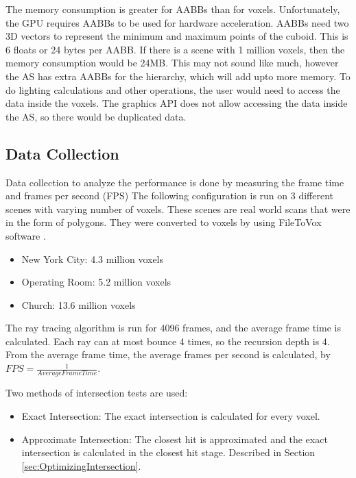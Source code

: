 \documentclass[12pt]{article}
\begin{document}
The memory consumption is greater for AABBs than for voxels.
Unfortunately, the GPU requires AABBs to be used for hardware acceleration.
AABBs need two 3D vectors to represent the minimum and maximum points of the cuboid.
This is 6 floats or 24 bytes per AABB.
If there is a scene with 1 million voxels, then the memory consumption would be 24MB.
This may not sound like much, however the AS has extra AABBs for the hierarchy, which will add upto more memory.
To do lighting calculations and other operations, the user would need to access the data inside the voxels.
The graphics API does not allow accessing the data inside the AS, so there would be duplicated data.

\subsection{Data Collection}
Data collection to analyze the performance is done by measuring the frame time and frames per second (FPS)
The following configuration is run on 3 different scenes with varying number of voxels.
These scenes are real world scans that were in the form of polygons.
They were converted to voxels by using FileToVox software \parencite{Github:FileToVox}.

\begin{itemize}
    \itemsep0em
    \item New York City: 4.3 million voxels \parencite{SketchFab:NewYorkCity}
    \item Operating Room: 5.2 million voxels \parencite{SketchFab:OperatingRoom}
    \item Church: 13.6 million voxels \parencite{SketchFab:Church}
\end{itemize}

The ray tracing algorithm is run for 4096 frames, and the average frame time is calculated.
Each ray can at most bounce 4 times, so the recursion depth is 4.
From the average frame time, the average frames per second is calculated, by $FPS = \frac{1}{Average Frame Time}$.

Two methods of intersection tests are used:
\begin{itemize}
    \itemsep0em
    \item Exact Intersection: The exact intersection is calculated for every voxel.
    \item Approximate Intersection: The closest hit is approximated and the exact intersection is calculated in the closest hit stage.
    Described in Section \ref{sec:OptimizingIntersection}.
\end{itemize}
\end{document}
